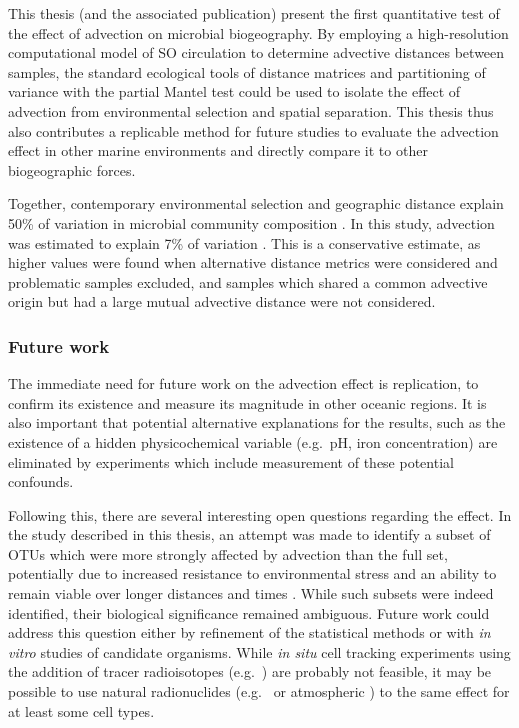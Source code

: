 This thesis (and the associated publication) present the first quantitative test of the effect of advection on microbial biogeography.
By employing a high-resolution computational model of \ac{SO} circulation to determine advective distances between samples, the standard ecological tools of distance matrices and partitioning of variance with the partial Mantel test could be used to isolate the effect of advection from environmental selection and spatial separation.
This thesis thus also contributes a replicable method for future studies to evaluate the advection effect in other marine environments and directly compare it to other biogeographic forces.



Together, contemporary environmental selection and geographic distance explain \textapprox{} 50\% of variation in microbial community composition \cite{Hanson:2012cb}.
In this study, advection was estimated to explain 7\% of variation .
This is a conservative estimate, as higher values were found when alternative distance metrics were considered and problematic samples excluded, and samples which shared a common advective origin but had a large mutual advective distance were not considered.

\subsubsection{Future work}

The immediate need for future work on the advection effect is replication, to confirm its existence and measure its magnitude in other oceanic regions.
It is also important that potential alternative explanations for the results, such as the existence of a hidden physicochemical variable (e.g.\ pH, iron concentration) are eliminated by experiments which include measurement of these potential confounds.

Following this, there are several interesting open questions regarding the effect.
In the study described in this thesis, an attempt was made to identify a subset of \acp{OTU} which were more strongly affected by advection than the full set, potentially due to increased resistance to environmental stress and an ability to remain viable over longer distances and times \cite{Bissett:2010wj}.
While such subsets were indeed identified, their biological significance remained ambiguous.
Future work could address this question either by refinement of the statistical methods or with \textit{in vitro} studies of candidate organisms.
While \textit{in situ} cell tracking experiments using the addition of tracer radioisotopes (e.g.\ ) are probably not feasible, it may be possible to use natural radionuclides (e.g.\  \cite{Savoye:2005ck} or atmospheric  \cite{Feng:1999ww}) to the same effect for at least some cell types.

